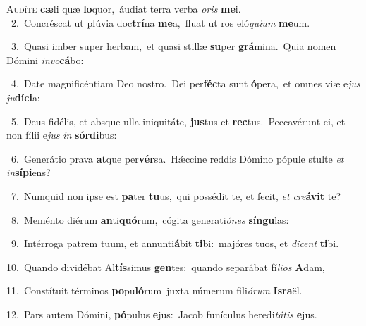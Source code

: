 \lettrine{\initial\textcolor{\initialcolor}{A}}{udíte} \textbf{cæ}\-li quæ \textbf{lo}\-quor,~\star áudiat terra verba \textit{o}\-\textit{ris} \textbf{me}\-i.\\
{\numbfont\textcolor{\numbcolor}{~2.}}~Concréscat ut plúvia doc\-\textbf{trí}\-na \textbf{me}\-a,~\star fluat ut ros eló\-\textit{qui}\-\textit{um} \textbf{me}\-um.\par
{\numbfont\textcolor{\numbcolor}{~3.}}~Quasi imber super herbam,~\dagger et quasi stillæ \textbf{su}\-per \textbf{grá}\-mina.~\star Quia nomen Dómini \textit{in}\-\textit{vo}\textbf{cá}bo:\par
{\numbfont\textcolor{\numbcolor}{~4.}}~Date magnificéntiam Deo nostro.~\dagger Dei per\-\textbf{féc}\-ta sunt \textbf{ó}\-pera,~\star et omnes viæ e\textit{jus} \textit{ju}\-\textbf{dí}\textbf{ci}a:\par
{\numbfont\textcolor{\numbcolor}{~5.}}~Deus fidélis, et absque ulla iniquitáte, \textbf{jus}\-tus et \textbf{rec}\-tus.~\star Peccavérunt ei, et non fílii e\textit{jus} \textit{in} \textbf{sór}\-\textbf{di}bus:\par
{\numbfont\textcolor{\numbcolor}{~6.}}~Generátio prava \textbf{at}\-que per\-\textbf{vér}\-sa.~\star Hǽccine reddis Dómino pópule stulte \textit{et} \textit{in}\-\textbf{sí}\textbf{pi}ens?\par
{\numbfont\textcolor{\numbcolor}{~7.}}~Numquid non ipse est \textbf{pa}\-ter \textbf{tu}\-us,~\star qui possédit te, et fecit, \textit{et} \textit{cre}\-\textbf{á}\textbf{vit} te?\par
{\numbfont\textcolor{\numbcolor}{~8.}}~Meménto diérum \textbf{an}\-ti\-\textbf{quó}\-rum,~\star cógita generati\-\textit{ó}\-\textit{nes} \textbf{sín}\-\textbf{gu}las:\par
{\numbfont\textcolor{\numbcolor}{~9.}}~Intérroga patrem tuum, et annunti\-\textbf{á}\-bit \textbf{ti}\-bi:~\star majóres tuos, et \textit{di}\-\textit{cent} \textbf{ti}\-bi.\par
{\numbfont\textcolor{\numbcolor}{10.}}~Quando dividébat Al\-\textbf{tís}\-simus \textbf{gen}\-tes:~\star quando separábat fí\-\textit{li}\-\textit{os} \textbf{A}\-dam,\par
{\numbfont\textcolor{\numbcolor}{11.}}~Constítuit términos \textbf{po}\-pu\-\textbf{ló}\-rum~\star juxta númerum fili\-\textit{ó}\-\textit{rum} \textbf{Is}\-\textbf{ra}ël.\par
{\numbfont\textcolor{\numbcolor}{12.}}~Pars autem Dómini, \textbf{pó}\-pulus \textbf{e}\-jus:~\star Jacob funículus heredi\-\textit{tá}\-\textit{tis} \textbf{e}\-jus.\par
